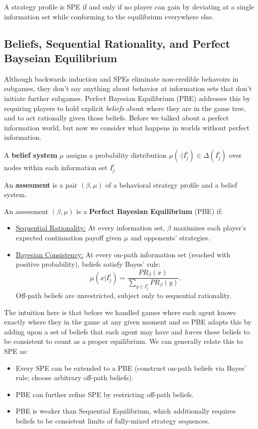\documentclass[11pt,english]{article}
\begin{document}
\begin{theorem}
A strategy profile is SPE if and only if no player can gain by deviating at a single information set while conforming to the equilibrium everywhere else.
\end{theorem}

\subsection{Beliefs, Sequential Rationality, and Perfect Bayseian Equilibrium}
Although backwards induction and SPEs eliminate non-credible behavoirs in subgames, they don't say anything about behavior at information sets that don't initiate further subgames. Perfect Bayesian Equilibrium (PBE) addresses this by requiring players to hold explicit \textit{beliefs} about where they are in the game tree, and to act rationally given those beliefs. Before we talked about a perfect information world, but now we consider what happens in worlds without perfect information.

\begin{definition}
A \textbf{belief system} $\mu$ assigns a probability distribution $\mu(\cdot|I_j^i) \in \Delta(I_j^i)$ over nodes within each information set $I_j^i$

An \textbf{assesment} is a pair $(\beta, \mu)$ of a behavioral strategy profile and a belief system.
\end{definition}

\begin{definition}
An assessment $(\beta, \mu)$ is a \textbf{Perfect Bayesian Equilibrium} (PBE) if:
\begin{itemize}
\item \underline{Sequential Rationality:} At every information set, $\beta$ maximizes each player's expected continuation payoff given $\mu$ and opponents' strategies.
\item \underline{Bayesian Consistency:} At every on-path information set (reached with positive probability), beliefs satisfy Bayes' rule: $$\mu(x|I_j^i) = \frac{PR_\beta (x)}{\sum_{y\in I_j^i}PR_\beta(y)}.$$Off-path beliefs are unrestricted, subject only to sequential rationality.
\end{itemize}
\end{definition}
The intuition here is that before we handled games where each agent knows exactly where they in the game at any given moment and so PBE adapts this by adding upon a set of beliefs that each agent may have and forces these beliefs to be consistent to count as a proper equilibrium. We can generally relate this to SPE as:
\begin{itemize}
\item Every SPE can be extended to a PBE (construct on-path beliefs via Bayes’ rule; choose arbitrary off-path beliefs).
\item PBE can further refine SPE by restricting off-path beliefs.
\item PBE is weaker than Sequential Equilibrium, which additionally requires beliefs to be consistent limits of fully-mixed strategy sequences.
\end{itemize}
\end{document}

